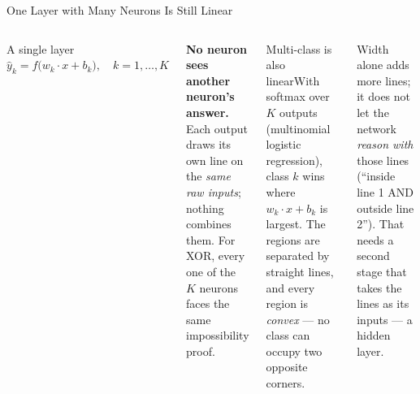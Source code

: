 \documentclass[aspectratio=169,10pt]{beamer}
\begin{document}
\begin{frame}{One Layer with Many Neurons Is Still Linear}
\begin{columns}[T]
\begin{fbx}{A single layer}
$\hat y_k=f\bigl(w_k\cdot x+b_k\bigr),\quad k=1,\dots,K$
\end{fbx}
\begin{wbox}\scriptsize\textbf{No neuron sees another neuron's answer.} Each output draws its own line on the \emph{same raw inputs}; nothing combines them. For XOR, every one of the $K$ neurons faces the same impossibility proof.\end{wbox}
\begin{cbox}{Multi-class is also linear}\scriptsize With softmax over $K$ outputs (multinomial logistic regression), class $k$ wins where $w_k\cdot x+b_k$ is largest. The regions are separated by straight lines, and every region is \emph{convex} --- no class can occupy two opposite corners.\end{cbox}
\begin{ibox}\scriptsize Width alone adds more lines; it does not let the network \emph{reason with} those lines (``inside line 1 AND outside line 2''). That needs a second stage that takes the lines as its inputs --- a hidden layer.\end{ibox}
\end{columns}
\end{frame}
\end{document}
